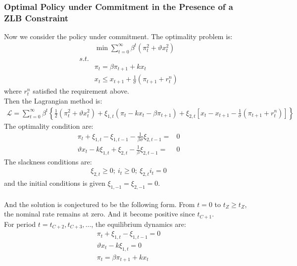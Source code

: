 \documentclass{article}
\numberwithin{equation}{section}
\begin{document}
\subsubsection{Optimal Policy under Commitment in the Presence of a ZLB Constraint}
Now we consider the policy under commitment. The optimality problem is:
	\begin{align*}
		&\min \sum\limits^\infty_{t=0} \beta^t(\pi^2_t + \vartheta x^2_t)\\
		s.t.&\\
		&\pi_t = \beta\pi_{t+1} + kx_t\\
		&x_t \leq x_{t+1} + \frac{1}{\sigma}(\pi_{t+1} + r^n_t)
	\end{align*}
where $r^n_t$ satisfied the requirement above.\\
Then the Lagrangian method is:
	\begin{align*}
		\mathscr{L} = \sum\limits^\infty_{t=0} \beta^t \left\{ \frac{1}{2}(\pi^2_t + \vartheta x^2_t) + \xi_{1,t}(\pi_t - kx_t - \beta\pi_{t+1}) + \xi_{2,t} \left[ x_t - x_{t+1} - \frac{1}{\sigma}(\pi_{t+1} + r^n_t ) \right] \right\}
	\end{align*}  
The optimality condition are:
	\begin{align}
		\pi_t + \xi_{1,t} - \xi_{1,t-1} - \frac{1}{\beta\sigma}\xi_{2,t-1} = &0 \label{3.3.2-1}\\
		\vartheta x_t - k\xi_{1,t} + \xi_{2,t} - \frac{1}{\beta}\xi_{2,t-1} = &0 \label{3.3.2-2}
	\end{align}
The slackness conditions are:
	\begin{align*}
		\xi_{2,t} \geq 0;\ i_t \geq 0;\ \xi_{2,t}i_t =0
	\end{align*}
and the initial conditions is given $\xi_{1,-1} = \xi_{2,-1} = 0$.\\\\
And the solution is conjectured to be the following form. From $t = 0$ to $t_Z \geq t_Z$, the nominal rate remains at zero. And it become positive since $t_{C+1}$.\\
For period $t = t_{C+2}, t_{C+3}, \ldots$, the equilibrium dynamics are:
	\begin{align}
		\pi_t + \xi_{1,t} - \xi_{1,t-1} = 0 \label{3.3.2-3}\\
		\vartheta x_t - k\xi_{1,t} = 0 \label{3.3.2-4}\\
		\pi_t = \beta\pi_{t+1} + kx_t \label{3.3.2-5}
	\end{align}
	
	
	
	
	
\end{document}
